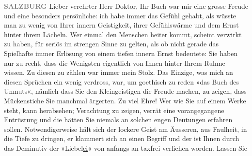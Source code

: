 \pstart
           \raggedleft{}\textcolor{gray}{\textbf{SALZBURG}}\pend
           \vspace{0.5em}
\pstart
           Lieber verehrter Herr Doktor, Ihr Buch war mir eine grosse Freude und eine besonders
               persönliche: ich habe immer das Gefühl gehabt, als wüsste man zu wenig von Ihrer
               innern Geistigkeit, ihrer Gefühlswärme und dem Ernst hinter ihrem Lächeln. Wer einmal
               den Menschen heiter kommt, scheint verwirkt zu haben, für seriös im strengen Sinne zu
               gelten, als ob nicht gerade das Spielhafte immer Erlösung von einem tiefen innern
               Ernst bedeutete: Sie haben nur zu recht, dass die Wenigsten eigentlich von Ihnen
               hinter Ihrem Ruhme wissen. Zu diesen zu zählen war immer mein Stolz. Das Einzige, was
               mich an diesen Sprüchen ein
               wenig verdross, war, um goethisch zu reden »das Buch des Unmuts«, nämlich dass Sie den
               Kleingeistigen die Freude machen, zu zeigen, dass Mückenstiche Sie manchmal ärgerten.
               Zu viel Ehre! Wer wie Sie auf einem Werke steht, kann herabsehen; Verachtung zu
               zeigen, verrät eine vorangegangene Entrüstung und die hätten Sie niemals an solchen
               engen Deutungen erfahren sollen. Notwendigerweise hält sich der lockere Geist am
               Äusseren, aus Faulheit, in die Tiefe zu dringen, er klammert sich an einen Begriff
               und der ist Ihnen durch das Deminutiv der »Liebel\uline{ei}« von anfangs an taxfrei verliehen worden. Lassen Sie
